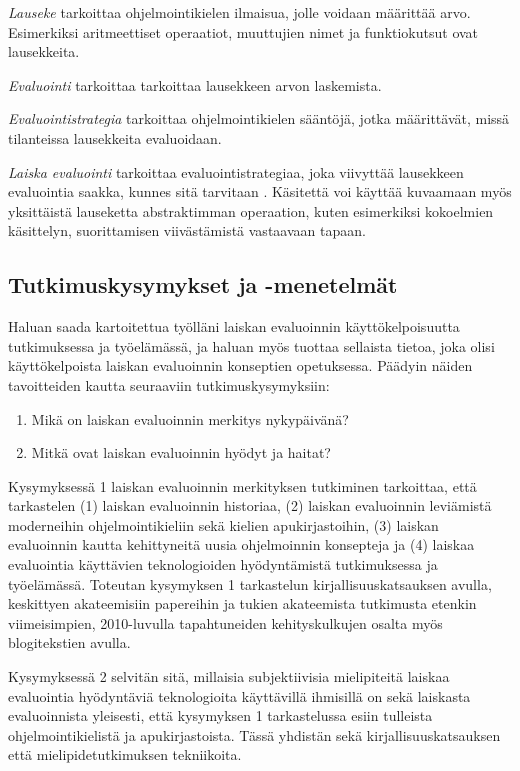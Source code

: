 \textit{Lauseke} tarkoittaa ohjelmointikielen ilmaisua, jolle voidaan määrittää arvo. Esimerkiksi aritmeettiset operaatiot, muuttujien nimet ja funktiokutsut ovat lausekkeita.

\textit{Evaluointi} tarkoittaa tarkoittaa lausekkeen arvon laskemista.

\textit{Evaluointistrategia} tarkoittaa ohjelmointikielen sääntöjä, jotka määrittävät, missä tilanteissa lausekkeita evaluoidaan.

\textit{Laiska evaluointi} tarkoittaa evaluointistrategiaa, joka viivyttää lausekkeen evaluointia saakka, kunnes sitä tarvitaan \citep{watt2004programming}. Käsitettä voi käyttää kuvaamaan myös yksittäistä lauseketta abstraktimman operaation, kuten esimerkiksi kokoelmien käsittelyn, suorittamisen viivästämistä vastaavaan tapaan.

\subsection{Tutkimuskysymykset ja -menetelmät}

Haluan saada kartoitettua työlläni laiskan evaluoinnin käyttökelpoisuutta tutkimuksessa ja työelämässä, ja haluan myös tuottaa sellaista tietoa, joka olisi käyttökelpoista laiskan evaluoinnin konseptien opetuksessa. Päädyin näiden tavoitteiden kautta seuraaviin tutkimuskysymyksiin:
\begin{enumerate}
  \item{Mikä on laiskan evaluoinnin merkitys nykypäivänä?}
  \item{Mitkä ovat laiskan evaluoinnin hyödyt ja haitat?}
\end{enumerate}

Kysymyksessä 1 laiskan evaluoinnin merkityksen tutkiminen tarkoittaa, että tarkastelen (1) laiskan evaluoinnin historiaa, (2) laiskan evaluoinnin leviämistä moderneihin ohjelmointikieliin sekä kielien apukirjastoihin, (3) laiskan evaluoinnin kautta kehittyneitä uusia ohjelmoinnin konsepteja ja (4) laiskaa evaluointia käyttävien teknologioiden hyödyntämistä tutkimuksessa ja työelämässä. Toteutan kysymyksen 1 tarkastelun kirjallisuuskatsauksen avulla, keskittyen akateemisiin papereihin ja tukien akateemista tutkimusta etenkin viimeisimpien, 2010-luvulla tapahtuneiden kehityskulkujen osalta myös blogitekstien avulla.

Kysymyksessä 2 selvitän sitä, millaisia subjektiivisia mielipiteitä laiskaa evaluointia hyödyntäviä teknologioita käyttävillä ihmisillä on sekä laiskasta evaluoinnista yleisesti, että kysymyksen 1 tarkastelussa esiin tulleista ohjelmointikielistä ja apukirjastoista. Tässä yhdistän sekä kirjallisuuskatsauksen että mielipidetutkimuksen tekniikoita.

